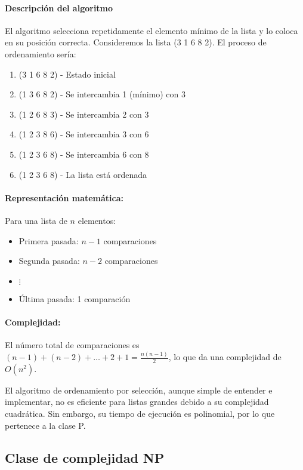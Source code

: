 \documentclass[12pt,titlepage,twoside,openright]{book}
\begin{document}
\paragraph{Descripci\'on del algoritmo}
El algoritmo selecciona repetidamente el elemento m\'inimo de la lista y lo coloca en su posici\'on correcta. Consideremos la lista (3 1 6 8 2). El proceso de ordenamiento ser\'ia:

\begin{enumerate}
    \item (3 1 6 8 2) - Estado inicial
    \item (1 3 6 8 2) - Se intercambia 1 (m\'inimo) con 3
    \item (1 2 6 8 3) - Se intercambia 2 con 3
    \item (1 2 3 8 6) - Se intercambia 3 con 6
    \item (1 2 3 6 8) - Se intercambia 6 con 8
    \item (1 2 3 6 8) - La lista est\'a ordenada
\end{enumerate}

\paragraph{Representaci\'on matem\'atica:}
Para una lista de $n$ elementos:
\begin{itemize}
    \item Primera pasada: $n-1$ comparaciones
    \item Segunda pasada: $n-2$ comparaciones
    \item $\vdots$
    \item \'Ultima pasada: 1 comparaci\'on
\end{itemize}

\paragraph{Complejidad:}
El n\'umero total de comparaciones es $(n-1) + (n-2) + \dots + 2 + 1 = \frac{n(n-1)}{2}$, lo que da una complejidad de $O(n^2)$.

El algoritmo de ordenamiento por selecci\'on, aunque simple de entender e implementar, no es eficiente para listas grandes debido a su complejidad cuadr\'atica. Sin embargo, su tiempo de ejecuci\'on es polinomial, por lo que pertenece a la clase P.

\subsection{Clase de complejidad NP}
\end{document}
